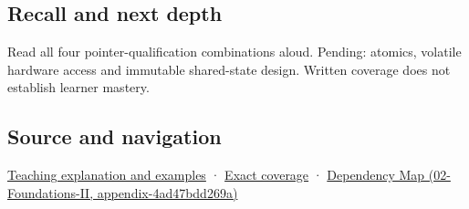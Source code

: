 \subsection{Recall and next depth}\label{recall-and-next-depth}

Read all four pointer-qualification combinations aloud. Pending: atomics, volatile hardware access and immutable shared-state design. Written coverage does not establish learner mastery.

\subsection{Source and navigation}\label{source-and-navigation}

\href{Continuous\%20Notes/Computing\%20Foundations\%20-\%20From\%20Bits\%20to\%20C++\%20and\%20Systems\%20APIs\#Read-only\%20is\%20a\%20path,\%20not\%20an\%20ownership\%20or\%20synchronization\%20promise}{Teaching explanation and examples} · \hyperref[appendix-fd090d982a15]{Exact coverage} · \href{}{Dependency Map (02-Foundations-II, appendix-4ad47bdd269a)}
